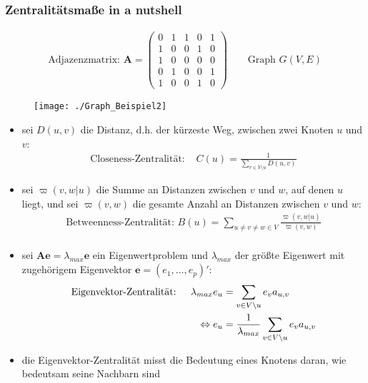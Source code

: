 \documentclass{beamer}
\begin{document}
\begin{frame}
	\frametitle{Zentralitätsmaße {\glqq}in a nutshell{\grqq}}
	\begin{align*}
	\text{Adjazenzmatrix: } \mathbf{A}=\begin{pmatrix}
	0 & 1 & 1 & 0 & 1 \\
	1 & 0 & 0 & 1 & 0 \\
	1 & 0 & 0 & 0 & 0 \\
	0 & 1 & 0 & 0 & 1 \\
	1 & 0 & 0 & 1 & 0
	\end{pmatrix} \qquad \text{Graph }G(V,E)
	\end{align*}
	\begin{figure}
	\centering
	\texttt{[image: ./Graph\_Beispiel2]}
	\label{fig:graphentheorie}
	\end{figure}
\end{frame}


\begin{frame}
	\begin{itemize}
	\item sei $D(u, v)$ die Distanz, d.h. der kürzeste Weg, zwischen zwei Knoten $u$ und $v$: 
	\begin{align*}
	\text{Closeness-Zentralität: } & C(u)=\frac{1}{\sum_{v \in V \setminus u} D(u, v)}
	\end{align*}
	\item sei $\varpi(v,w|u)$ die Summe an Distanzen zwischen $v$ und $w$, auf denen $u$ liegt, und sei $\varpi(v,w)$ die gesamte Anzahl an Distanzen zwischen $v$ und $w$:
	\begin{align*}
		\text{Betweenness-Zentralität: } B(u)=\sum_{u \neq v \neq w \in V} \frac{\varpi(v,w|u)}{\varpi(v,w)}\\
	\end{align*}
	\end{itemize}
\end{frame}

\begin{frame}
\begin{itemize}
\item sei $\mathbf{A}\mathbf{e}=\lambda_{max} \mathbf{e}$ ein Eigenwertproblem und $\lambda_{max}$ der größte Eigenwert mit zugehörigem Eigenvektor $\mathbf{e}=(e_1,\dots, e_{p})'$:
	\begin{align*}
	&\text{Eigenvektor-Zentralität: } & \lambda_{max} e_u &= \sum_{v \in V\setminus u} e_v a_{u,v} \notag \\
	&&\Leftrightarrow e_u &=\frac{1}{\lambda_{max}} \sum_{v \in V\setminus u} e_v a_{u,v}
	\end{align*}
	\item die Eigenvektor-Zentralität misst die Bedeutung eines Knotens daran, wie bedeutsam seine Nachbarn sind 
\end{itemize}
\end{frame}
\end{document}
